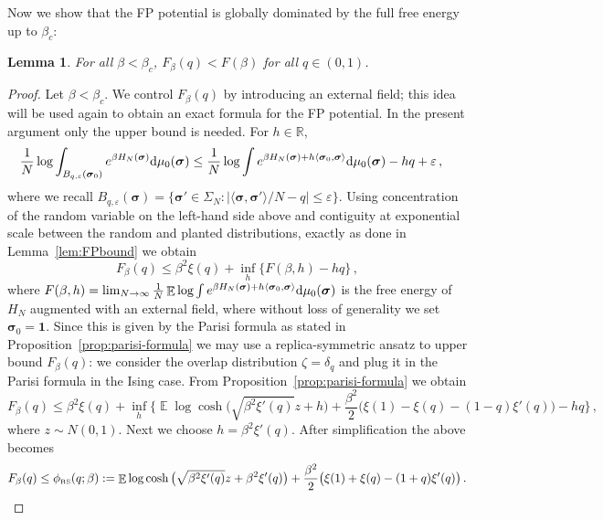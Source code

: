 \documentclass[11pt]{article}
\newtheorem{lemma}[theorem]{Lemma}
\theoremstyle{definition}
\numberwithin{equation}{section}
\def\reals{{\mathbb R}}
\newcommand{\<}{\langle}
\renewcommand{\>}{\rangle}
\def\bsigma{{\boldsymbol{\sigma}}}
\def\bbE{{\mathbb{E}}}
\def\RS{\mbox{\tiny\rm RS}}
\def\de{{\rm d}}
\DeclareMathOperator*{\E}{\bbE}
\def\eps{\varepsilon}
\def\one{{\mathbf{1}}}
\begin{document}
Now we show that the FP potential is globally dominated by the full free energy up to $\beta_c$: 
\begin{lemma}\label{lem:FPglobal}
For all $\beta < \beta_c$, $F_{\beta}(q) < F(\beta)$ for all $q \in (0,1)$.
\end{lemma}
\begin{proof}
Let $\beta < \beta_c$. We control $F_{\beta}(q)$ by introducing an external field; this idea will be used again to obtain an exact formula for the FP potential. In the present argument only the upper bound is needed. For $h \in \reals$,
\begin{align*}
\frac{1}{N}\log \int_{B_{q,\eps}(\bsigma_0)}  e^{\beta H_{N}(\bsigma)} \de \mu_0(\bsigma) &\le 
\frac{1}{N}\log \int  e^{\beta H_{N}(\bsigma) + h \langle \bsigma_0,\bsigma\rangle} \de \mu_0(\bsigma) - h q + \eps \,, 
\end{align*}
where we recall $B_{q,\eps}(\bsigma) = \{\bsigma' \in \Sigma_N : |\langle \bsigma , \bsigma'\rangle/N - q|\le \eps\}$. Using concentration of the random variable on the left-hand side above and contiguity at exponential scale between the random and planted distributions, exactly as done in Lemma~\ref{lem:FPbound} we obtain 
\begin{equation}\label{eq:FPbound2}
F_{\beta}(q) \le \beta^2 \xi(q) + \inf_{h} \big\{F(\beta,h) -hq\big\}\,,
\end{equation}
where $F(\beta,h) = \lim_{N\to \infty} \frac{1}{N}\E\log \int  e^{\beta H_{N}(\bsigma) + h \langle \bsigma_0,\bsigma\rangle} \de \mu_0(\bsigma)$ is the free energy of $H_N$ augmented with an external field, where without loss of generality we set $\bsigma_0 = \one$. Since this is given by the Parisi formula as stated in Proposition~\ref{prop:parisi-formula} we may use a replica-symmetric ansatz to upper bound $F_{\beta}(q)$: we consider the overlap distribution $\zeta = \delta_{q}$ and plug it in the Parisi formula in the Ising case. From Proposition~\ref{prop:parisi-formula} we obtain 
\begin{equation}\label{eq:FPbound3}
F_{\beta}(q) \le \beta^2 \xi(q) + \inf_{h}\Big\{\E \log \cosh\big(\sqrt{\beta^2 \xi'(q)}z + h\big) + \frac{\beta^2}{2} \big(\xi(1) - \xi(q) - (1-q)\xi'(q)\big) - hq \Big\}\, ,
\end{equation}
where $z \sim N(0,1)$. Next we choose $h = \beta^2\xi'(q)$. After simplification the above becomes 
\begin{equation}\label{eq:FPbound4}
F_{\beta}(q) \le \phi_{\RS}(q;\beta) := \E \log \cosh\big(\sqrt{\beta^2 \xi'(q)}z + \beta^2 \xi'(q)\big) + \frac{\beta^2}{2} \big(\xi(1) + \xi(q) - (1+q)\xi'(q)\big) \, .

\end{equation}
\end{proof}
\end{document}
